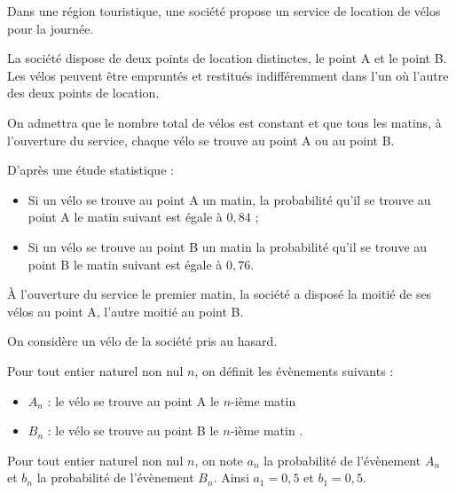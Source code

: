 
\medskip

Dans une région touristique, une société propose un service de location de vélos pour la journée.

\smallskip

La société dispose de deux points de location distinctes, le point A et le point B. Les vélos peuvent être empruntés et restitués indifféremment dans l'un où l'autre des deux points de location.

\smallskip

On admettra que le nombre total de vélos est constant et que tous les matins, à l'ouverture du service, chaque vélo se trouve au point A ou au point B.

\smallskip

D'après une étude statistique :

\smallskip

\setlength\parindent{1cm}
\begin{itemize}
\item[$\bullet~~$] Si un vélo se trouve au point A un matin, la probabilité qu'il se trouve au point A le matin suivant est égale à $0,84$ ;
\item[$\bullet~~$] Si un vélo se trouve au point B un matin la probabilité qu'il se trouve au point B le matin suivant est égale à $0,76$.
\end{itemize}
\setlength\parindent{0cm}

À l'ouverture du service le premier matin, la société a disposé la moitié de ses vélos au point A, l'autre moitié au point B.

\smallskip

On considère un vélo de la société pris au hasard.

\smallskip

Pour tout entier naturel non nul $n$, on définit les évènements suivants :

\setlength\parindent{1cm}
\begin{itemize}
\item[$\bullet~~$]$A_n$ : \og le vélo se trouve au point A le $n$-ième matin \fg{}
\item[$\bullet~~$]$B_n$ : \og le vélo se trouve au point B le $n$-ième matin \fg.
\end{itemize}
\setlength\parindent{0cm}

Pour tout entier naturel non nul $n$, on note $a_n$ la probabilité de l'évènement $A_n$ et $b_n$ la probabilité de l'évènement $B_n$. Ainsi $a_1 = 0,5$ et $b_1 =  0,5$.

